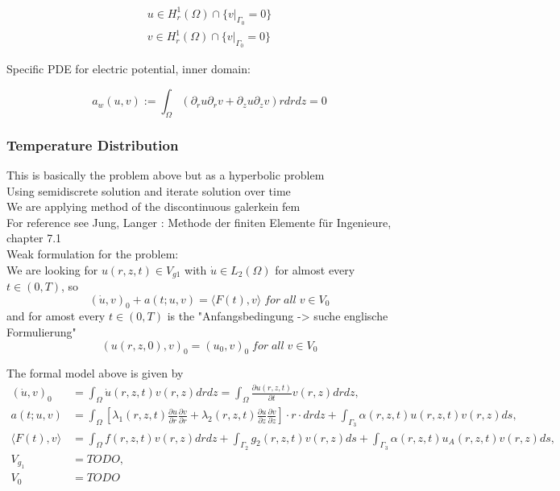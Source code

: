 \documentclass[parskip=half, titlepage=yes, 12pt, BCOR=12mm, DIV=calc]{scrartcl}
\begin{document}
\begin{align}
    u \in H_r^1(\Omega) \cap \{v|_{\Gamma_{0}} = 0 \} \\
    v \in H_r^1(\Omega) \cap \{v|_{\Gamma_{0}} = 0 \}     
\end{align}


Specific PDE for electric potential, inner domain: 

\begin{equation}
    a_w(u,v) := \int_{\Omega} (\partial_r u \partial_r v + \partial_z u \partial_z v) r drdz = 0 
\end{equation}

\subsubsection{Temperature Distribution}

This is basically the problem above but as a hyperbolic problem \\
Using semidiscrete solution and iterate solution over time \\
We are applying method of the discontinuous galerkein fem \\
For reference see Jung, Langer : Methode der finiten Elemente für Ingenieure, chapter 7.1 \\



Weak formulation for the problem: \\

We are looking for $u(r,z,t) \in V_{g1}$ with $\Dot{u} \in L_2(\Omega)$ for almost every $t \in (0,T)$, so \\ \begin{equation}
(\Dot{u},v)_0 + a(t;u,v) = \langle F(t),v \rangle \; for \; all \; v \in V_0    
\end{equation}
and for amost every $t \in (0, T)$ is the "Anfangsbedingung -> suche englische Formulierung"
\begin{equation}
    (u(r,z,0),v)_0 = (u_0,v)_0 \; for \; all \; v \in V_0
\end{equation}

The formal model above is given by 
\begin{align*}
    (\Dot{u},v)_0 &= \int_{\Omega} \Dot{u}(r,z,t)v(r,z) drdz = \int_{\Omega} \frac{\partial u(r,z,t)}{\partial t} v(r,z) drdz, \\
    a(t;u,v) &= \int_{\Omega} \left[ \lambda_1(r,z,t) \frac{\partial u}{\partial r} \frac{\partial v}{\partial r} + \lambda_2(r,z,t) \frac{\partial u}{\partial z} \frac{\partial v}{\partial z} \right] \cdot r \cdot drdz + \int_{\Gamma_3} \alpha(r,z,t)u(r,z,t)v(r,z) ds, \\
    \langle F(t),v \rangle &= \int_{\Omega} f(r,z,t)v(r,z) drdz + \int_{\Gamma_2} g_2(r,z,t)v(r,z) ds + \int_{\Gamma_3} \alpha(r,z,t)u_A(r,z,t)v(r,z) ds, \\
    V_{g_1} &= TODO, \\
    V_0 &= TODO
\end{align*}
\end{document}
